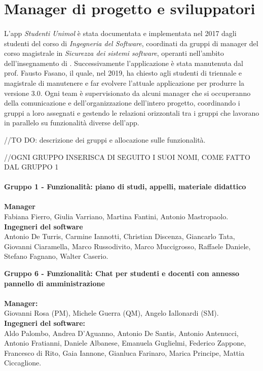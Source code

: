 \section{Manager di progetto e sviluppatori}

\paragraph{}
L'app \textit{Studenti Unimol} è stata documentata e implementata nel 2017 dagli studenti del corso di \textit{Ingegneria del Software}, coordinati da gruppi di manager del corso magistrale in \textit{Sicurezza dei sistemi software}, operanti nell'ambito dell'insegnamento di . Successivamente l'applicazione è stata manutenuta dal prof. Fausto Fasano, il quale, nel 2019, ha chiesto agli studenti di triennale e magistrale di manutenere e far evolvere l'attuale applicazione per produrre la versione 3.0. Ogni team è supervisionato da alcuni manager che si occuperanno della comunicazione e dell'organizzazione dell'intero progetto, coordinando i gruppi a loro assegnati e gestendo le relazioni orizzontali tra i gruppi che lavorano in parallelo su funzionalità diverse dell'app.

//TO DO: descrizione dei gruppi e allocazione sulle funzionalità.

//OGNI GRUPPO INSERISCA DI SEGUITO I SUOI NOMI, COME FATTO DAL GRUPPO 1 \\ \\
\textbf {Gruppo 1 - Funzionalità: piano di studi, appelli, materiale didattico} \\ \\
\textbf{Manager} \\
Fabiana Fierro, Giulia Varriano, Martina Fantini, Antonio Mastropaolo. \\
\textbf{Ingegneri del software} \\
Antonio De Turris, Carmine Iannotti, Christian Discenza, Giancarlo Tata, Giovanni Ciaramella, Marco Russodivito, Marco Muccigrosso, Raffaele Daniele, Stefano Fagnano, Walter Caserio.

\textbf{Gruppo 6 - Funzionalità: Chat per studenti e docenti con annesso pannello di amministrazione} \\ \\
\textbf{Manager:} \\
Giovanni Rosa (PM),
Michele Guerra (QM),
Angelo Iallonardi (SM). \\
\textbf{Ingegneri del software:} \\
Aldo Palombo,
Andrea D'Aguanno,
Antonio De Santis,
Antonio Antenucci,
Antonio Fratianni,
Daniele Albanese,
Emanuela Guglielmi,
Federico Zappone,
Francesco di Rito,
Gaia Iannone,
Gianluca Farinaro,
Marica Principe,
Mattia Ciccaglione.

